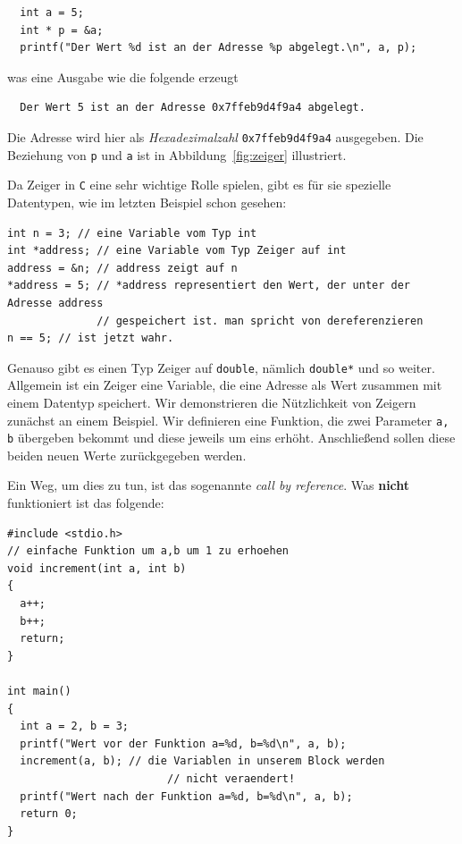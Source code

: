 \begin{minipage}{\linewidth}
\begin{lstlisting}
  int a = 5;
  int * p = &a;
  printf("Der Wert %d ist an der Adresse %p abgelegt.\n", a, p);
\end{lstlisting}
\end{minipage}
was eine Ausgabe wie die folgende erzeugt
\begin{verbatim}
  Der Wert 5 ist an der Adresse 0x7ffeb9d4f9a4 abgelegt.
\end{verbatim}
Die Adresse wird hier als \emph{Hexadezimalzahl} \verb|0x7ffeb9d4f9a4| ausgegeben.
Die Beziehung von \verb|p| und \verb|a| ist in Abbildung~\ref{fig:zeiger} illustriert.

Da Zeiger in \texttt{C} eine sehr wichtige Rolle spielen, gibt es für sie spezielle Datentypen, wie im letzten Beispiel schon gesehen:

\begin{minipage}{\linewidth}
\begin{lstlisting}
int n = 3; // eine Variable vom Typ int
int *address; // eine Variable vom Typ Zeiger auf int
address = &n; // address zeigt auf n
*address = 5; // *address representiert den Wert, der unter der Adresse address
              // gespeichert ist. man spricht von dereferenzieren
n == 5; // ist jetzt wahr.
\end{lstlisting}
\end{minipage}
Genauso gibt es einen Typ Zeiger auf \verb|double|, nämlich \verb|double*| und so weiter.
Allgemein ist ein Zeiger eine Variable, die eine Adresse als Wert zusammen mit einem Datentyp speichert.
Wir demonstrieren die Nützlichkeit von Zeigern zunächst an einem Beispiel.
Wir definieren eine Funktion, die zwei Parameter \verb|a, b| übergeben bekommt und diese jeweils um eins erhöht.
Anschließend sollen diese beiden neuen Werte zurückgegeben werden.

Ein Weg, um dies zu tun, ist das sogenannte \emph{call by reference}.
Was \textbf{nicht} funktioniert ist das folgende:

\begin{minipage}{\linewidth}
\begin{lstlisting}
#include <stdio.h>
// einfache Funktion um a,b um 1 zu erhoehen
void increment(int a, int b)
{
  a++;
  b++;
  return;
}

int main()
{
  int a = 2, b = 3;
  printf("Wert vor der Funktion a=%d, b=%d\n", a, b);
  increment(a, b); // die Variablen in unserem Block werden
                         // nicht veraendert!
  printf("Wert nach der Funktion a=%d, b=%d\n", a, b);
  return 0;
}
\end{lstlisting}
\end{minipage}

